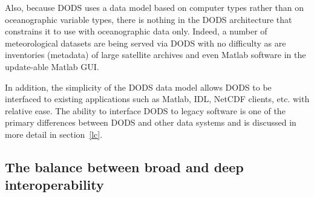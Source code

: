 \documentclass[12pt]{article}
\begin{document}
Also, because \ac{DODS} uses a data model based on computer types rather than
on oceanographic variable types, there is nothing in the \ac{DODS}
architecture that constrains it to use with oceanographic data only.  Indeed,
a number of meteorological datasets are being served via \ac{DODS} with no
difficulty as are inventories (metadata) of large satellite archives and
even Matlab software in the update-able Matlab GUI.

In addition, the simplicity of the \ac{DODS} data model allows \ac{DODS} to
be interfaced to existing applications such as Matlab, IDL, \acs{NetCDF}
clients, etc. with relative ease. The ability to interface \ac{DODS} to
legacy software is one of the primary differences between \ac{DODS} and other
data systems and is discussed in more detail in section~\ref{lc}.

\subsection{The balance between broad and deep interoperability}
\label{dmd}
\end{document}
